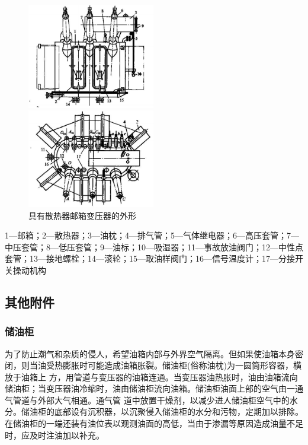 \documentclass{book}
\begin{document}
\begin{figure}  %
	\begin{minipage}[H]{0.5\linewidth}  
		\centering  
		\includegraphics[width=2.2in]{2-7-1.png}  
	\end{minipage}
	\begin{minipage}[H]{0.5\linewidth}  
		\centering  
		\includegraphics[width=2.2in]{2-7-2.png}  	 
	\end{minipage} 
	\caption{具有散热器邮箱变压器的外形}  
	\label{fig_2.7}
\end{figure} 
1—邮箱；2—散热器；3—油枕；4—排气管；5—气体继电器；6—高压套管；7—中压套管；8—低压套管；9—油标；10—吸湿器；11—事故放油阀门；12—中性点套管；13—接地螺栓；14—滚轮；15—取油样阀门；16—信号温度计；17—分接开关操动机构
\subsection{其他附件}
\subsubsection{储油柜}

为了防止潮气和杂质的侵人，希望油箱内部与外界空气隔离。但如果使油箱本身密闭，则当油受热膨胀时可能造成油箱胀裂。储油柜(俗称油枕)为一圆筒形容器，横放于油箱上 方，用管道与变压器的油箱连通。当变压器油热胀时，油由油箱流向储油柜；当变压器油冷缩时，油由储油柜流向油箱。储油柜油面上部的空气由一通气管道与外部大气相通。通气管 道中放置干燥剂，以减少进人储油柜空气中的水分。储油柜的底部设有沉积器，以沉聚侵入储油柜的水分和污物，定期加以排除。在储油柜的一端还装有油位表以观测油面的高低，当由于渗漏等原因造成油量不足时，应及时注油加以补充。
\end{document}
